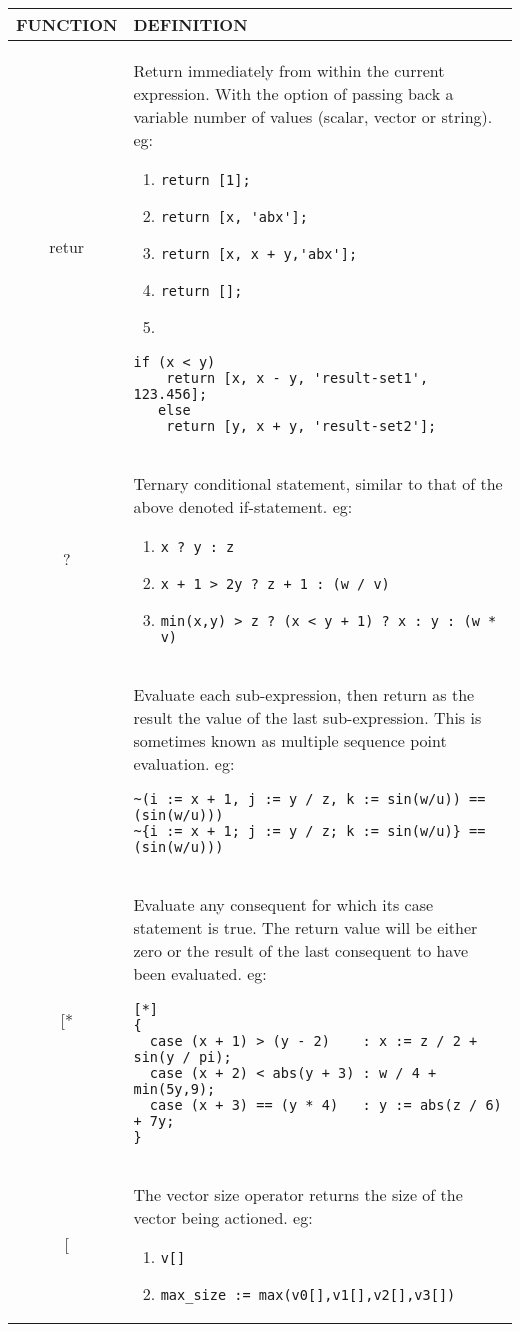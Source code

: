 \begin{tabular}{|c|p{}|}
\hline 
FUNCTION & DEFINITION\tabularnewline
\hline 
retur & Return immediately from within the current expression. With the option
of passing back a variable number of values (scalar, vector or string).
eg: 
\begin{enumerate}
\item \verb"return [1]; " 
\item \verb"return [x, 'abx'];" 
\item \verb"return [x, x + y,'abx'];" 
\item \verb"return [];" 
\item 
\end{enumerate}
\begin{verbatim}
if (x < y)                                       
    return [x, x - y, 'result-set1', 123.456];      
   else                                             
    return [y, x + y, 'result-set2'];               
\end{verbatim}
\tabularnewline
? & Ternary conditional statement, similar to that of the above denoted
if-statement. eg: 
\begin{enumerate}
\item \verb"x ? y : z" 
\item \verb"x + 1 > 2y ? z + 1 : (w / v)" 
\item \verb"min(x,y) > z ? (x < y + 1) ? x : y : (w * v)" 
\end{enumerate}
\tabularnewline
 & Evaluate each sub-expression, then return as the result the value
of the last sub-expression. This is sometimes known as multiple sequence
point evaluation. eg: 
\begin{verbatim}
~(i := x + 1, j := y / z, k := sin(w/u)) == (sin(w/u)))
~{i := x + 1; j := y / z; k := sin(w/u)} == (sin(w/u)))
\end{verbatim}
\tabularnewline
{[}{*} & Evaluate any consequent for which its case statement is true. The
return value will be either zero or the result of the last consequent
to have been evaluated. eg: 
\begin{verbatim}
[*]                                                     
{                                                       
  case (x + 1) > (y - 2)    : x := z / 2 + sin(y / pi); 
  case (x + 2) < abs(y + 3) : w / 4 + min(5y,9);        
  case (x + 3) == (y * 4)   : y := abs(z / 6) + 7y;     
}              
\end{verbatim}
\tabularnewline
{[} & The vector size operator returns the size of the vector being actioned.
eg: 
\begin{enumerate}
\item \verb"v[]" 
\item \verb"max_size := max(v0[],v1[],v2[],v3[])" 
\end{enumerate}
\tabularnewline
\hline 
\end{tabular}

